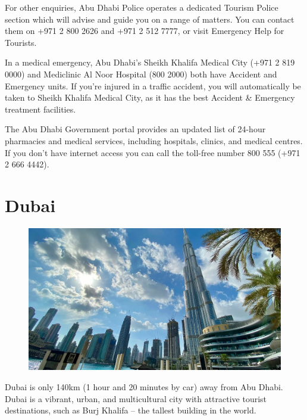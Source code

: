 For other enquiries, Abu Dhabi Police operates a dedicated Tourism Police section which will advise and guide you on a range of matters. 
You can contact them on +971 2 800 2626 and +971 2 512 7777, or visit Emergency Help for Tourists.

In a medical emergency, Abu Dhabi’s Sheikh Khalifa Medical City (+971 2 819 0000) and Mediclinic Al Noor Hospital (800 2000) both have Accident and Emergency units. 
If you’re injured in a traffic accident, you will automatically be taken to Sheikh Khalifa Medical City, as it has the best Accident \& Emergency treatment facilities.

The Abu Dhabi Government portal provides an updated list of 24-hour pharmacies and medical services, including hospitals, clinics, and medical centres. 
If you don’t have internet access you can call the toll-free number 800 555 (+971 2 666 4442).\\

\section{Dubai}
\begin{figure}[h!]
 \centering
     \includegraphics[width=0.9\linewidth]{examples/handbook_coling25/local_guide/images/dubai.png}
\end{figure}
Dubai is only 140km (1 hour and 20 minutes by car) away from Abu Dhabi.
 Dubai is a vibrant, urban, and multicultural city with attractive tourist destinations, such as Burj Khalifa – the tallest building in the world.\\

